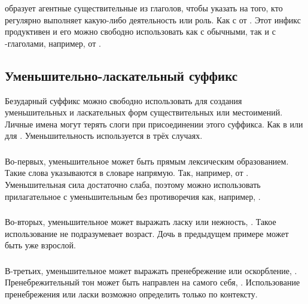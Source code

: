 \subsubsection{}  образует агентные существительные из глаголов, чтобы указать на того, кто регулярно выполняет какую-либо деятельность или роль. Как с
  от  .  Этот инфикс продуктивен и его можно свободно использовать как с обычными, так и с -глаголами, например,   от  .


\subsection{Уменьшительно-ласкательный суффикс} Безударный суффикс  можно свободно использовать для создания уменьшительных и ласкательных форм существительных или местоимений.  Личные имена могут терять слоги при присоединении этого суффикса. Как в  или
 для .  Уменьшительность используется в трёх случаях.
\label{lingop:dimin}

\subsubsection{} Во-первых, уменьшительное может быть прямым лексическим образованием.  Такие слова указываются в словаре напрямую. Так, например,
  от  .  Уменьшительная сила достаточно слаба, поэтому можно использовать прилагательное   с уменьшительным без противоречия как, например, 
 .

\subsubsection{} Во-вторых, уменьшительное может выражать ласку или нежность,  . Такое использование не подразумевает возраст.  Дочь в предыдущем примере может быть уже взрослой.

\subsubsection{} В-третьих, уменьшительное может выражать пренебрежение или оскорбление,  .  Пренебрежительный тон может быть направлен на самого себя,  .  Использование пренебрежения или ласки возможно определить только по контексту.


